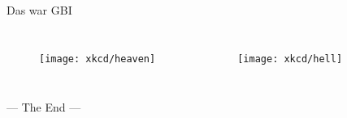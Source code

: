 \begin{frame}{Das war GBI}
	\begin{columns}
		\pause
		\begin{figure}[H]
			\vspace{-20pt}
			\texttt{[image: xkcd/heaven]}
		\end{figure}
	
		\pause
		\begin{figure}[H]
			\vspace{-20pt}
			\texttt{[image: xkcd/hell]}
		\end{figure}
	\end{columns}
\end{frame}

\begin{headframe}
	--- The End ---
\end{headframe}


\slideThanks

